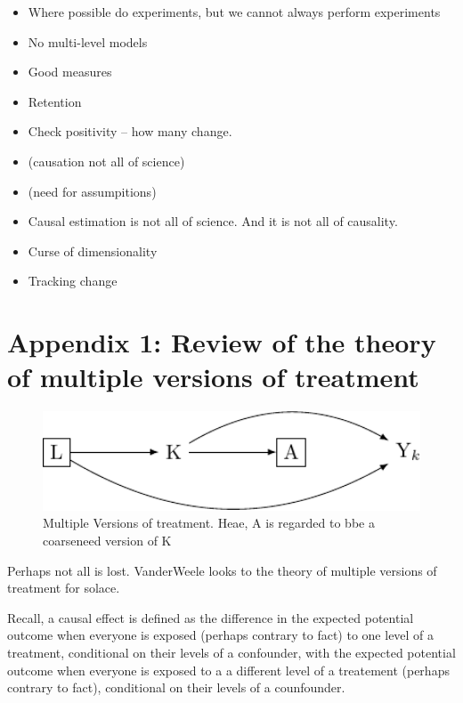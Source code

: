 \documentclass[
  singlecolumn]{report}
\providecommand{\tightlist}{%
  \setlength{\itemsep}{0pt}\setlength{\parskip}{0pt}}\usepackage{longtable,booktabs,array}
\begin{document}
\begin{itemize}
\tightlist
\item
  Where possible do experiments, but we cannot always perform
  experiments\\
\item
  No multi-level models
\item
  Good measures
\item
  Retention
\item
  Check positivity -- how many change.
\item
  (causation not all of science)
\item
  (need for assumpitions)
\item
  Causal estimation is not all of science. And it is not all of
  causality.
\item
  Curse of dimensionality
\item
  Tracking change
\end{itemize}

\hypertarget{appendix-1-review-of-the-theory-of-multiple-versions-of-treatment}{%
\section{Appendix 1: Review of the theory of multiple versions of
treatment}\label{appendix-1-review-of-the-theory-of-multiple-versions-of-treatment}}

\begin{figure}

{\centering \includegraphics[width=1\textwidth,height=\textheight]{causal-dags_files/figure-pdf/fig_dag_multiple_version_treatment_dag-1.pdf}

}

\caption{Multiple Versions of treatment. Heae, A is regarded to bbe a
coarseneed version of K}

\end{figure}

Perhaps not all is lost. VanderWeele looks to the theory of multiple
versions of treatment for solace.

Recall, a causal effect is defined as the difference in the expected
potential outcome when everyone is exposed (perhaps contrary to fact) to
one level of a treatment, conditional on their levels of a confounder,
with the expected potential outcome when everyone is exposed to a a
different level of a treatement (perhaps contrary to fact), conditional
on their levels of a counfounder.
\end{document}
